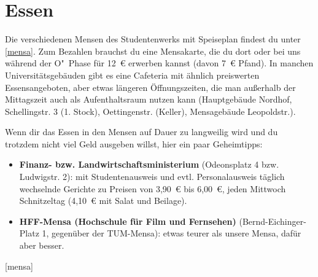 \section{Essen}
Die verschiedenen Mensen des Studentenwerks mit Speiseplan findest du unter \ref{mensa}. 
Zum Bezahlen brauchst du eine Mensakarte, die du dort oder bei uns während der O"~Phase für 12~€ erwerben kannst (davon 7~€ Pfand). In manchen Universitätsgebäuden gibt es eine Cafeteria mit ähnlich preiswerten Essensangeboten, aber etwas längeren Öffnungszeiten, die man außerhalb der Mittagszeit auch als Aufenthaltsraum nutzen kann (Hauptgebäude Nordhof, Schellingstr. 3 (1. Stock), Oettingenstr. (Keller), Mensagebäude Leopoldstr.).

Wenn dir das Essen in den Mensen auf Dauer zu langweilig wird und du trotzdem nicht viel Geld ausgeben willst, hier ein paar Geheimtipps:

\begin{itemize}
	\item \textbf{Finanz- bzw. Landwirtschaftsministerium} (Odeonsplatz 4 bzw. Ludwigstr. 2): mit Studentenausweis und evtl. Personalausweis täglich wechselnde Gerichte zu Preisen von 3,90~€ bis 6,00~€, jeden Mittwoch Schnitzeltag (4,10~€ mit Salat und Beilage).
	
	\item \textbf{HFF-Mensa (Hochschule für Film und Fernsehen)}
          (Bernd-Eichinger-Platz 1, gegenüber der TUM-Mensa): etwas
          teurer als unsere Mensa, dafür aber besser.
\end{itemize}

\begin{urlList}
	[mensa]
\end{urlList}
